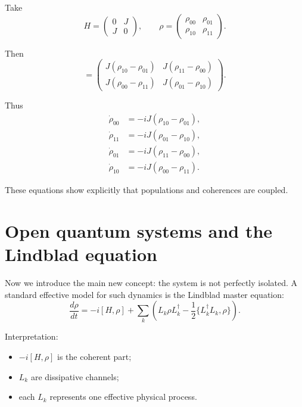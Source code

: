 \documentclass[11pt,a4paper]{article}
\begin{document}
Take
\begin{equation}
H =
\begin{pmatrix}
0 & J \\
J & 0
\end{pmatrix},
\qquad
\rho =
\begin{pmatrix}
\rho_{00} & \rho_{01} \\
\rho_{10} & \rho_{11}
\end{pmatrix}.
\end{equation}

Then
\begin{equation}
[H,\rho] =
\begin{pmatrix}
J(\rho_{10}-\rho_{01}) & J(\rho_{11}-\rho_{00}) \\
J(\rho_{00}-\rho_{11}) & J(\rho_{01}-\rho_{10})
\end{pmatrix}.
\end{equation}

Thus
\begin{align}
\dot{\rho}_{00} &= -iJ(\rho_{10}-\rho_{01}), \\
\dot{\rho}_{11} &= -iJ(\rho_{01}-\rho_{10}), \\
\dot{\rho}_{01} &= -iJ(\rho_{11}-\rho_{00}), \\
\dot{\rho}_{10} &= -iJ(\rho_{00}-\rho_{11}).
\end{align}

These equations show explicitly that populations and coherences are coupled.

\section{Open quantum systems and the Lindblad equation}

Now we introduce the main new concept: the system is not perfectly isolated. A
standard effective model for such dynamics is the Lindblad master equation:
\begin{equation}
\frac{d\rho}{dt}
= -i[H,\rho]
+ \sum_k \left(L_k\rho L_k^\dagger - \frac12\{L_k^\dagger L_k,\rho\}\right).
\end{equation}

Interpretation:
\begin{itemize}
  \item $-i[H,\rho]$ is the coherent part;
  \item $L_k$ are dissipative channels;
  \item each $L_k$ represents one effective physical process.
\end{itemize}
\end{document}
